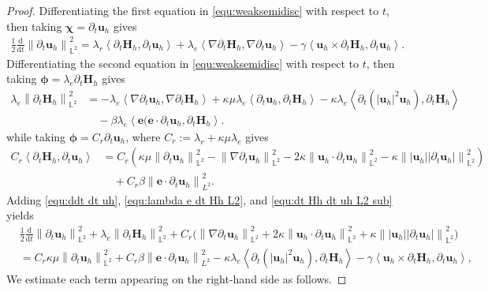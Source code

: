 \documentclass[11pt, reqno]{amsart}
\theoremstyle{definition}
\theoremstyle{remark}
\numberwithin{equation}{section}
\newcommand{\bff}{\boldsymbol}
\newcommand{\bb}{\mathbb}
\newcommand{\ddt}{\frac{\mathrm{d}}{\mathrm{d}t}}
\newcommand{\norm}[2]{\left\|{#1}\right\|_{#2}}
\newcommand{\inpro}[2]{\left\langle#1,#2\right\rangle}
\begin{document}
\begin{proof}
Differentiating the first equation in \eqref{equ:weaksemidisc} with respect to $t$, then taking $\bff{\chi}= \partial_t \bff{u}_h$ gives
\begin{align}\label{equ:ddt dt uh}
	\frac{1}{2} \ddt \norm{\partial_t \bff{u}_h}{\bb{L}^2}^2
	=
	\lambda_r \inpro{\partial_t \bff{H}_h}{\partial_t \bff{u}_h}
	+
	\lambda_e \inpro{\nabla \partial_t \bff{H}_h}{\nabla \partial_t \bff{u}_h}
	-
	\gamma \inpro{\bff{u}_h \times \partial_t \bff{H}_h}{\partial_t \bff{u}_h}.
\end{align}
Differentiating the second equation in \eqref{equ:weaksemidisc} with respect to $t$, then taking $\bff{\phi}= \lambda_e \partial_t \bff{H}_h$ gives
\begin{align}\label{equ:lambda e dt Hh L2}
	\lambda_e \norm{\partial_t \bff{H}_h}{\bb{L}^2}^2
	&=
	-\lambda_e
	\inpro{\nabla \partial_t \bff{u}_h}{\nabla \partial_t \bff{H}_h}
	+
	\kappa\mu \lambda_e
	\inpro{\partial_t \bff{u}_h}{\partial_t \bff{H}_h}
	-
	\kappa \lambda_e
	\inpro{\partial_t (|\bff{u}_h|^2 \bff{u}_h)}{\partial_t \bff{H}_h}
	\nonumber \\
	&\quad
	-
	\beta\lambda_e \inpro{\bff{e}(\bff{e}\cdot\partial_t \bff{u}_h}{\partial_t \bff{H}_h}.
\end{align}
while taking $\bff{\phi}= C_r \partial_t \bff{u}_h$, where $C_r:=\lambda_r+\kappa\mu\lambda_e$ gives
\begin{align}\label{equ:dt Hh dt uh L2 sub}
	C_r \inpro{\partial_t \bff{H}_h}{\partial_t \bff{u}_h}
	&=
	C_r \left(
	\kappa \mu \norm{\partial_t \bff{u}_h}{\bb{L}^2}^2
	- 
	\norm{\nabla \partial_t \bff{u}_h}{\bb{L}^2}^2
	-
	2\kappa \norm{\bff{u}_h \cdot \partial_t \bff{u}_h}{\bb{L}^2}^2
	-
	\kappa \norm{|\bff{u}_h| |\partial_t \bff{u}_h|}{\bb{L}^2}^2\right)
	\nonumber \\
	&\quad
	+
	C_r \beta \norm{\bff{e}\cdot \partial_t \bff{u}_h}{L^2}^2.
\end{align}
Adding \eqref{equ:ddt dt uh}, \eqref{equ:lambda e dt Hh L2}, and \eqref{equ:dt Hh dt uh L2 sub} yields
\begin{align*}
	&\frac{1}{2} \ddt \norm{\partial_t \bff{u}_h}{\bb{L}^2}^2
	+
	\lambda_e \norm{\partial_t \bff{H}_h}{\bb{L}^2}^2
	+
	C_r \big( \norm{\nabla \partial_t \bff{u}_h}{\bb{L}^2}^2
	+
	2\kappa \norm{\bff{u}_h \cdot \partial_t \bff{u}_h}{\bb{L}^2}^2
	+
	\kappa \norm{|\bff{u}_h| |\partial_t \bff{u}_h|}{\bb{L}^2}^2 \big)
	\\
	&=
	C_r \kappa \mu \norm{\partial_t \bff{u}_h}{\bb{L}^2}^2
	+
	C_r \beta \norm{\bff{e}\cdot \partial_t \bff{u}_h}{L^2}^2
	-
	\kappa \lambda_e \inpro{\partial_t (|\bff{u}_h|^2 \bff{u}_h)}{\partial_t \bff{H}_h}
	-
	\gamma \inpro{\bff{u}_h \times \partial_t \bff{H}_h}{\partial_t \bff{u}_h},
\end{align*}
We estimate each term appearing on the right-hand side as follows.


\end{proof}
\end{document}
